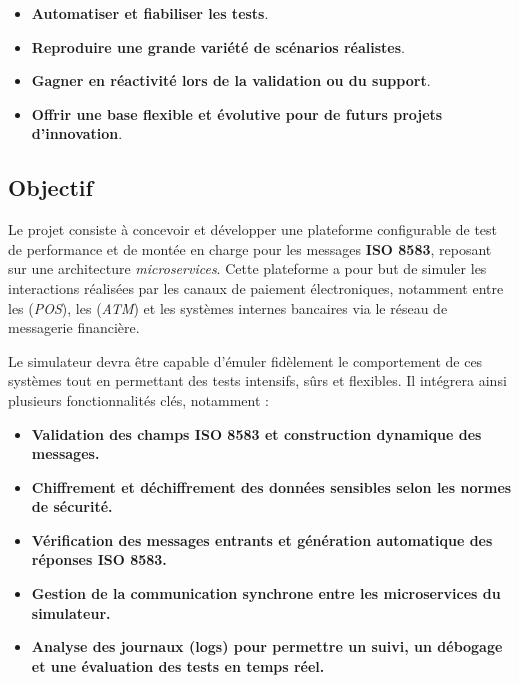 \begin{itemize}
     [label=\textbullet]\item \textbf {Automatiser et fiabiliser les tests}.
     \vspace{0.5cm}
    \item \textbf {Reproduire une grande variété de scénarios réalistes}.
    \vspace{0.5cm}
    \item \textbf {Gagner en réactivité lors de la validation ou du support}.
    \vspace{0.5cm}
    \item \textbf {Offrir une base flexible et évolutive pour de futurs projets d’innovation}.
\end{itemize}




\subsection{Objectif}

Le projet consiste à concevoir et développer une plateforme configurable de test de performance et de montée en charge pour les messages \textbf{ISO 8583}, reposant sur une architecture \textit{microservices}. Cette plateforme a pour but de simuler les interactions réalisées par les canaux de paiement électroniques, notamment entre les  (\textit{POS}), les (\textit{ATM}) et les systèmes internes bancaires via le réseau de messagerie financière.

Le simulateur devra être capable d’émuler fidèlement le comportement de ces systèmes tout en permettant des tests intensifs, sûrs et flexibles. Il intégrera ainsi plusieurs fonctionnalités clés, notamment :

\begin{itemize}[label=\textbullet]
     \item \textbf{Validation des champs ISO 8583 et construction dynamique des messages.}
       \vspace{0.5cm}
    \item \textbf{Chiffrement et déchiffrement des données sensibles selon les normes de sécurité.}
      \vspace{0.5cm}
    \item \textbf{Vérification des messages entrants et génération automatique des réponses ISO 8583.}
      \vspace{0.5cm}
    \item \textbf{Gestion de la communication synchrone entre les microservices du simulateur.}
      \vspace{0.5cm}
    \item \textbf{Analyse des journaux (logs) pour permettre un suivi, un débogage et une évaluation des tests en temps réel.}
\end{itemize}


